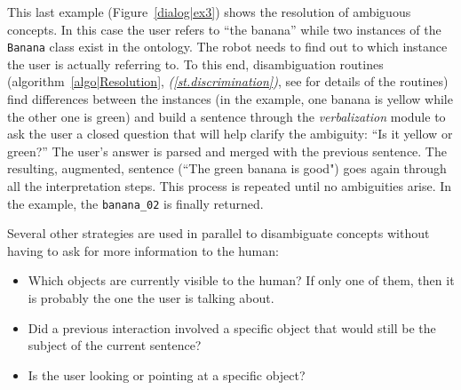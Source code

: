 \documentclass[twocolumn]{svjour3}
\newcommand{\concept}[1]{{\footnotesize \texttt{#1}}}
\begin{document}
This last example (Figure~\ref{dialog|ex3}) shows the resolution of ambiguous
concepts. In this case the user refers to ``the banana'' while two instances of 
the \concept{Banana} class exist in the ontology. The robot needs to find out
to which instance the user is actually referring to. To this end,
disambiguation routines (algorithm~\ref{algo|Resolution},
\emph{(\ref{st.discrimination})}, see \cite{Ros2010b} for details of the routines)
find differences between the instances (in the example, one banana is yellow
while the other one is green) and build a sentence through the
\emph{verbalization} module to ask the user a closed question that will
help clarify the ambiguity: ``Is it yellow or green?'' The user's answer is
parsed and merged with the previous sentence. The resulting, augmented,
sentence (``The green banana is good") goes again through all the
interpretation steps. This process is repeated until no ambiguities arise. 
In the example, the \concept{banana\_02} is finally returned.


Several other strategies are used in parallel to disambiguate concepts without
having to ask for more information to the human:

\begin{itemize}
	\item Which objects are currently visible to the human? If only one of
	them, then it is probably the one the user is talking about. 
	\item Did a previous interaction involved a specific object that would
	still be the subject of the current sentence?
	\item Is the user looking or pointing at a specific object?
\end{itemize}

\end{document}
